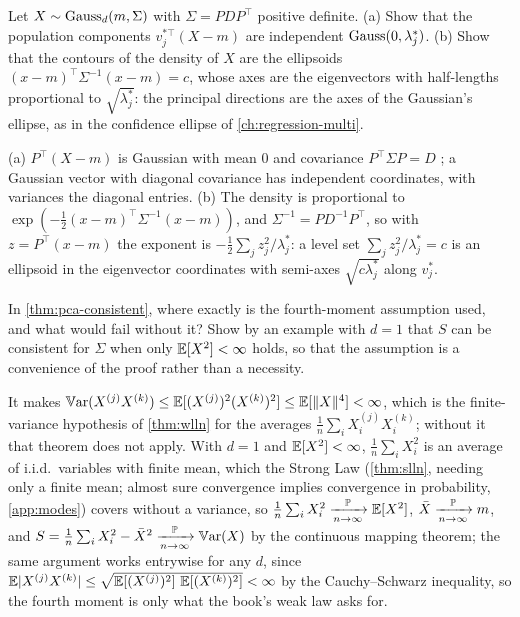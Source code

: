 \begin{exercise}
\label{ex:pca-gaussian}
Let $X \sim \text{Gauss}_d(m, \Sigma)$ with $\Sigma = PDP^\top$ positive definite. (a) Show that the population components $v_j^{*\top}(X - m)$ are independent $\text{Gauss}(0, \lambda_j^*)$. (b) Show that the contours of the density of $X$ are the ellipsoids $(x - m)^\top\Sigma^{-1}(x - m) = c$, whose axes are the eigenvectors with half-lengths proportional to $\sqrt{\lambda_j^*}$: the principal directions are the axes of the Gaussian's ellipse, as in the confidence ellipse of \cref{ch:regression-multi}.
\end{exercise}
\begin{solution}
(a) $P^\top(X - m)$ is Gaussian with mean $0$ and covariance $P^\top\Sigma P = D$ ; a Gaussian vector with diagonal covariance has independent coordinates, with variances the diagonal entries. (b) The density is proportional to $\exp(-\frac12(x - m)^\top\Sigma^{-1}(x - m))$, and $\Sigma^{-1} = PD^{-1}P^\top$, so with $z = P^\top(x - m)$ the exponent is $-\frac12\sum_jz_j^2/\lambda_j^*$: a level set $\sum_jz_j^2/\lambda_j^* = c$ is an ellipsoid in the eigenvector coordinates with semi-axes $\sqrt{c\lambda_j^*}$ along $v_j^*$.
\end{solution}

\begin{exercise}
\label{ex:pca-variance-of-S}
In \cref{thm:pca-consistent}, where exactly is the fourth-moment assumption used, and what would fail without it? Show by an example with $d = 1$ that $S$ can be consistent for $\Sigma$ when only $\operatorname*{\mathbb{E}}[X^2] < \infty$ holds, so that the assumption is a convenience of the proof rather than a necessity.
\end{exercise}
\begin{solution}
It makes $\operatorname*{\mathbb{V}\text{ar}}(X^{(j)}X^{(k)}) \leq \operatorname*{\mathbb{E}}[(X^{(j)})^2(X^{(k)})^2] \leq \operatorname*{\mathbb{E}}[\lVert X\rVert^4] < \infty$, which is the finite-variance hypothesis of \cref{thm:wlln} for the averages $\frac1n\sum_iX_i^{(j)}X_i^{(k)}$; without it that theorem does not apply. With $d = 1$ and $\operatorname*{\mathbb{E}}[X^2] < \infty$, $\frac1n\sum_iX_i^2$ is an average of i.i.d.\ variables with finite mean, which the Strong Law (\cref{thm:slln}, needing only a finite mean; almost sure convergence implies convergence in probability, \cref{app:modes}) covers without a variance, so $\frac1n\sum_iX_i^2 \xrightarrow [n \to \infty ]{\mathbb{P}} \operatorname*{\mathbb{E}}[X^2]$, $\bar{X} \xrightarrow [n \to \infty ]{\mathbb{P}} m$, and $S = \frac1n\sum_iX_i^2 - \bar{X}^2 \xrightarrow [n \to \infty ]{\mathbb{P}} \operatorname*{\mathbb{V}\text{ar}}(X)$ by the continuous mapping theorem; the same argument works entrywise for any $d$, since $\operatorname*{\mathbb{E}}\lvert X^{(j)}X^{(k)}\rvert \leq \sqrt{\operatorname*{\mathbb{E}}[(X^{(j)})^2]\,\operatorname*{\mathbb{E}}[(X^{(k)})^2]} < \infty$ by the Cauchy--Schwarz inequality, so the fourth moment is only what the book's weak law asks for.
\end{solution}

